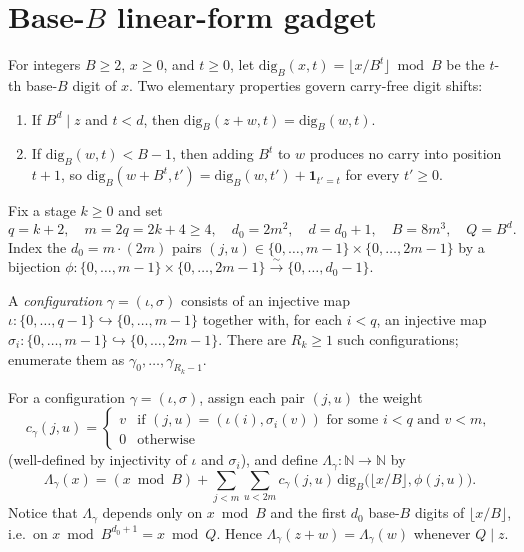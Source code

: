 \documentclass[11pt,a4paper]{amsart}
\theoremstyle{remark}
\begin{document}
\section{\texorpdfstring{Base-$B$ linear-form gadget}{Base-B linear-form gadget}}

For integers $B \ge 2$, $x \ge 0$, and $t \ge 0$, let $\mathrm{dig}_B(x, t) = \lfloor x / B^t \rfloor \bmod B$ be the $t$-th base-$B$ digit of $x$. Two elementary properties govern carry-free digit shifts:
\begin{enumerate}
\item If $B^d \mid z$ and $t < d$, then $\mathrm{dig}_B(z + w, t) = \mathrm{dig}_B(w, t)$.
\item If $\mathrm{dig}_B(w, t) < B - 1$, then adding $B^t$ to $w$ produces no carry into position $t + 1$, so $\mathrm{dig}_B(w + B^t, t') = \mathrm{dig}_B(w, t') + \mathbf{1}_{t' = t}$ for every $t' \ge 0$.
\end{enumerate}

Fix a stage $k \ge 0$ and set
\[
q = k + 2, \quad m = 2q = 2k + 4 \ge 4, \quad d_0 = 2 m^2, \quad d = d_0 + 1, \quad B = 8 m^3, \quad Q = B^d.
\]
Index the $d_0 = m \cdot (2m)$ pairs $(j, u) \in \{0, \dots, m - 1\} \times \{0, \dots, 2m - 1\}$ by a bijection $\phi : \{0, \dots, m - 1\} \times \{0, \dots, 2m - 1\} \xrightarrow{\sim} \{0, \dots, d_0 - 1\}$.

A \emph{configuration} $\gamma = (\iota, \sigma)$ consists of an injective map $\iota : \{0, \dots, q - 1\} \hookrightarrow \{0, \dots, m - 1\}$ together with, for each $i < q$, an injective map $\sigma_i : \{0, \dots, m - 1\} \hookrightarrow \{0, \dots, 2m - 1\}$. There are $R_k \ge 1$ such configurations; enumerate them as $\gamma_0, \dots, \gamma_{R_k - 1}$.

For a configuration $\gamma = (\iota, \sigma)$, assign each pair $(j, u)$ the weight
\[
c_\gamma(j, u) =
\begin{cases}
v & \text{if } (j, u) = (\iota(i), \sigma_i(v)) \text{ for some } i < q \text{ and } v < m,\\
0 & \text{otherwise}
\end{cases}
\]
(well-defined by injectivity of $\iota$ and $\sigma_i$), and define $\Lambda_\gamma : \mathbb{N} \to \mathbb{N}$ by
\[
\Lambda_\gamma(x) = (x \bmod B) + \sum_{j < m} \sum_{u < 2m} c_\gamma(j, u)\, \mathrm{dig}_B\bigl(\lfloor x / B \rfloor, \phi(j, u)\bigr).
\]
Notice that $\Lambda_\gamma$ depends only on $x \bmod B$ and the first $d_0$ base-$B$ digits of $\lfloor x / B \rfloor$, i.e.\ on $x \bmod B^{d_0 + 1} = x \bmod Q$. Hence $\Lambda_\gamma(z + w) = \Lambda_\gamma(w)$ whenever $Q \mid z$.
\end{document}
